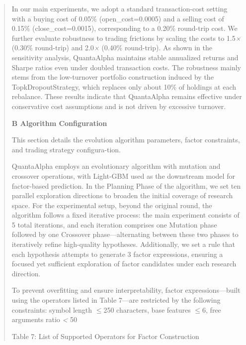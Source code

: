 \documentclass[
]{article}
\begin{document}
\begin{quote}
In our main experiments, we adopt a standard transaction-cost setting
with a buying cost of 0.05\% (open\_cost=0.0005) and a selling cost of
0.15\% (close\_cost=0.0015), corresponding to a 0.20\% round-trip cost.
We further evaluate robustness to trading frictions by scaling the costs
to 1.5\emph{×} (0.30\% round-trip) and 2.0\emph{×} (0.40\% round-trip).
As shown in the sensitivity analysis, QuantaAlpha maintains stable
annualized returns and Sharpe ratios even under doubled transaction
costs. The robustness mainly stems from the low-turnover portfolio
construction induced by the TopkDropoutStrategy, which replaces only
about 10\% of holdings at each rebalance. These results indicate that
QuantaAlpha remains effective under conservative cost assumptions and is
not driven by excessive turnover.

\textbf{B Algorithm Configuration}

This section details the evolution algorithm parameters, factor
constraints, and trading strategy configura-tion.

QuantaAlpha employs an evolutionary algorithm with mutation and
crossover operations, with Light-GBM used as the downstream model for
factor-based prediction. In the Planning Phase of the algorithm, we set
ten parallel exploration directions to broaden the initial coverage of
research space. For the experimental setup, beyond the original round,
the algorithm follows a fixed iterative process: the main experiment
consists of 5 total iterations, and each iteration comprises one
Mutation phase followed by one Crossover phase---alternating between
these two phases to iteratively refine high-quality hypotheses.
Additionally, we set a rule that each hypothesis attempts to generate 3
factor expressions, ensuring a focused yet sufficient exploration of
factor candidates under each research direction.

To prevent overfitting and ensure interpretability, factor
expressions---built using the operators listed in Table 7---are
restricted by the following constraints: symbol length \emph{$\le$}250
characters, base features \emph{$\le$}6, free arguments ratio
\emph{\textless{}} 50

Table 7: List of Supported Operators for Factor Construction
\end{quote}
\end{document}
